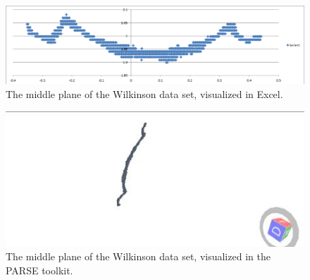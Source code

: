 \begin{figure}[h]
\begin{center}
\includegraphics[scale=0.4]{./testing/wilko2} 
\end{center}
\caption{The middle plane of the Wilkinson data set, visualized in Excel.}
\label{fig:the middle plane of the Wilkinson data set, visualized in excel.}
\end{figure}

\begin{figure}[h]
\begin{center}
\includegraphics[scale=0.4]{./testing/wilko3} 
\end{center}
\caption{The middle plane of the Wilkinson data set, visualized in the PARSE toolkit.}
\label{fig:The middle plane of the wilkinson data set, visualized in the parse toolkit.}
\end{figure}